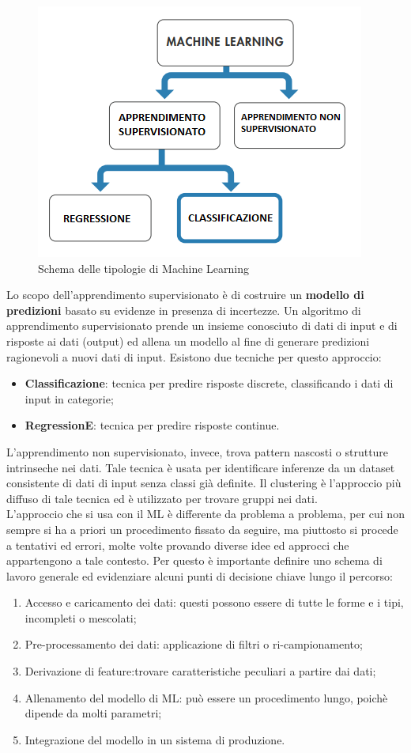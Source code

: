 \begin{figure}[]
	\centering
	\includegraphics[scale=1]{images/Tipologie_Machine_Learning.png}
	\caption{Schema delle tipologie di Machine Learning}
\end{figure}
Lo scopo dell'apprendimento supervisionato è di costruire un \textbf{modello di predizioni} basato su evidenze in presenza di incertezze. Un algoritmo di apprendimento supervisionato prende un insieme conosciuto di dati di input e di risposte ai dati (output) ed allena un modello al fine di generare predizioni ragionevoli a nuovi dati di input. Esistono due tecniche per questo approccio:
\begin{itemize}
	\item \textbf{Classificazione}: tecnica per predire risposte discrete, classificando i dati di input in categorie;
	\item \textbf{RegressionE}: tecnica per predire risposte continue.
\end{itemize}
L'apprendimento non supervisionato, invece, trova pattern nascosti o strutture intrinseche nei dati. Tale tecnica è usata per identificare inferenze da un dataset consistente di dati di input senza classi già definite. Il clustering è l'approccio più diffuso di tale tecnica ed è utilizzato per trovare gruppi nei dati.\\
L'approccio che si usa con il ML è differente da problema a problema, per cui non sempre si ha a priori un procedimento fissato da seguire, ma piuttosto si procede a tentativi ed errori, molte volte provando diverse idee ed approcci che appartengono a tale contesto. Per questo è importante definire uno schema di lavoro generale ed evidenziare alcuni punti di decisione chiave lungo il percorso:
\begin{enumerate}
	\item Accesso e caricamento dei dati: questi possono essere di tutte le forme e i tipi, incompleti o mescolati;
	\item Pre-processamento dei dati: applicazione di filtri o ri-campionamento;
	\item Derivazione di feature:trovare caratteristiche peculiari a partire dai dati;
	\item Allenamento del modello di ML: può essere un procedimento lungo, poichè dipende da molti parametri;
	\item Integrazione del modello in un sistema di produzione.
\end{enumerate}
